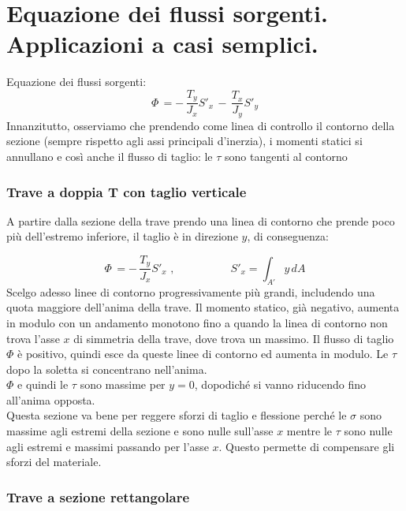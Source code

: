\section{Equazione dei flussi sorgenti. Applicazioni a casi semplici.}

Equazione dei flussi sorgenti:
\begin{equation*}
       \Phi\, = -\, \frac{T_y}{J_x}S'_x  \,-\, \frac{T_x}{J_y}S'_y 
    \end{equation*}
Innanzitutto, osserviamo che prendendo come linea di controllo il contorno della sezione (sempre rispetto agli assi principali d'inerzia), i momenti statici si annullano e così anche il flusso di taglio: le $\tau$ sono tangenti al contorno

\subsubsection*{Trave a doppia T con taglio verticale}
A partire dalla sezione della trave prendo una linea di contorno che prende poco più dell'estremo inferiore, il taglio è in direzione $y$, di conseguenza:

\begin{equation*}
       \Phi\, = -\, \frac{T_y}{J_x}S'_x  \,\,, \quad \quad \quad  \quad \quad S'_x = \int_{A'}y \,dA
    \end{equation*}
    Scelgo adesso linee di contorno progressivamente più grandi, includendo una quota maggiore dell'anima della trave. Il momento statico, già negativo, aumenta in modulo con un andamento monotono fino a quando la linea di contorno non trova l'asse $x$ di simmetria della trave, dove trova un massimo. Il flusso di taglio $\Phi$ è positivo, quindi esce da queste linee di contorno ed aumenta in modulo. Le $\tau$ dopo la soletta si concentrano nell'anima.\\
    $\Phi$ e quindi le $\tau$ sono massime per $y=0$, dopodiché si vanno riducendo fino all'anima opposta.\\
    Questa sezione va bene per reggere sforzi di taglio e flessione perché le $\sigma$ sono massime agli estremi della sezione e sono nulle sull'asse $x$ mentre le $\tau$ sono nulle agli estremi e massimi passando per l'asse $x$. Questo permette di compensare gli sforzi del materiale.
    
\subsubsection*{Trave a sezione rettangolare}

